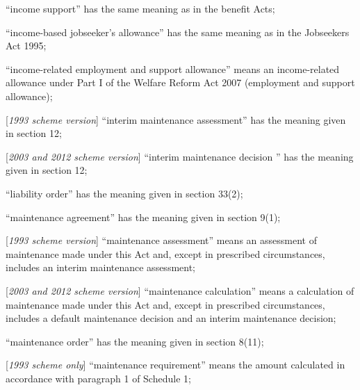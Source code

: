 \documentclass[12pt,a4paper]{article}
\begin{document}
\begin{enumerate}


    “income support” has the same meaning as in the benefit Acts;

“income-based jobseeker’s allowance” has the same meaning as in the Jobseekers Act 1995;

“income-related employment and support allowance” means an income-related allowance under Part I of the Welfare Reform Act 2007 (employment and support allowance);

    [\emph{1993 scheme version}] “interim maintenance assessment” has the meaning given in section 12;

    [\emph{2003 and 2012 scheme version}] “interim maintenance 
decision%
” has the meaning given in section 12;

    “liability order” has the meaning given in section 33(2);

    “maintenance agreement” has the meaning given in section 9(1);

    [\emph{1993 scheme version}] “maintenance assessment” means an assessment of maintenance made under this Act and, except in prescribed circumstances, includes an interim maintenance assessment;

[\emph{2003 and 2012 scheme version}] “maintenance calculation” means a calculation of maintenance made under this Act and, except in prescribed circumstances, includes a default maintenance decision and an interim maintenance decision;

    “maintenance order” has the meaning given in section 8(11);

[\emph{1993 scheme only}]         “maintenance requirement” means the amount calculated in accordance with paragraph 1 of Schedule 1;


\end{enumerate}
\end{document}
